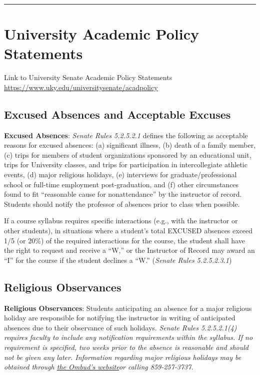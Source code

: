 \documentclass[
  letterpaper,
  DIV=11,
  numbers=noendperiod]{scrartcl}
\begin{document}
\begin{center}\rule{0.5\linewidth}{0.5pt}\end{center}

\hypertarget{university-academic-policy-statements}{%
\section{University Academic Policy
Statements}\label{university-academic-policy-statements}}

Link to University Senate Academic Policy Statements
\url{https://www.uky.edu/universitysenate/acadpolicy}

\hypertarget{excused-absences-and-acceptable-excuses}{%
\subsection{Excused Absences and Acceptable
Excuses}\label{excused-absences-and-acceptable-excuses}}

\textbf{Excused Absences}: \emph{Senate Rules 5.2.5.2.1} defines the
following as acceptable reasons for excused absences: (a) significant
illness, (b) death of a family member, (c) trips for members of student
organizations sponsored by an educational unit, trips for University
classes, and trips for participation in intercollegiate athletic events,
(d) major religious holidays, (e) interviews for graduate/professional
school or full-time employment post-graduation, and (f) other
circumstances found to fit ``reasonable cause for nonattendance'' by the
instructor of record. Students should notify the professor of absences
prior to class when possible.

If a course syllabus requires specific interactions (e.g., with the
instructor or other students), in situations where a student's total
EXCUSED absences exceed 1/5 (or 20\%) of the required interactions for
the course, the student shall have the right to request and receive a
``W,'' or the Instructor of Record may award an ``I'' for the course if
the student declines a ``W.'' (\emph{Senate Rules 5.2.5.2.3.1})

\hypertarget{religious-observances}{%
\subsection{Religious Observances}\label{religious-observances}}

\textbf{Religious Observances}: Students anticipating an absence for a
major religious holiday are responsible for notifying the instructor in
writing of anticipated absences due to their observance of such
holidays. \emph{Senate Rules 5.2.5.2.1(4) requires faculty to include
any notification requirements within the syllabus. If no requirement is
specified, two weeks prior to the absence is reasonable and should not
be given any later. Information regarding major religious holidays may
be obtained through
\href{https://www.uky.edu/ombud/religious-observation-accommodations}{the
Ombud's website}or calling 859-257-3737.}
\end{document}
